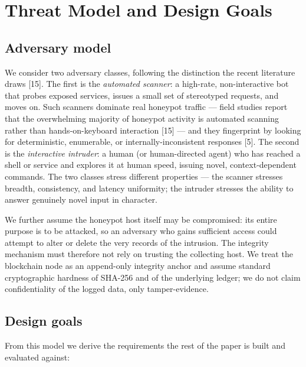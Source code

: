 \documentclass[conference]{IEEEtran}
\begin{document}
\section{Threat Model and Design Goals}

\subsection{Adversary model}

We consider two adversary classes, following the distinction the recent literature draws [15]. The first is the \emph{automated scanner}: a high-rate, non-interactive bot that probes exposed services, issues a small set of stereotyped requests, and moves on. Such scanners dominate real honeypot traffic --- field studies report that the overwhelming majority of honeypot activity is automated scanning rather than hands-on-keyboard interaction [15] --- and they fingerprint by looking for deterministic, enumerable, or internally-inconsistent responses [5]. The second is the \emph{interactive intruder}: a human (or human-directed agent) who has reached a shell or service and explores it at human speed, issuing novel, context-dependent commands. The two classes stress different properties --- the scanner stresses breadth, consistency, and latency uniformity; the intruder stresses the ability to answer genuinely novel input in character.

We further assume the honeypot host itself may be compromised: its entire purpose is to be attacked, so an adversary who gains sufficient access could attempt to alter or delete the very records of the intrusion. The integrity mechanism must therefore not rely on trusting the collecting host. We treat the blockchain node as an append-only integrity anchor and assume standard cryptographic hardness of SHA-256 and of the underlying ledger; we do not claim confidentiality of the logged data, only tamper-evidence.

\subsection{Design goals}

From this model we derive the requirements the rest of the paper is built and evaluated against:
\end{document}
